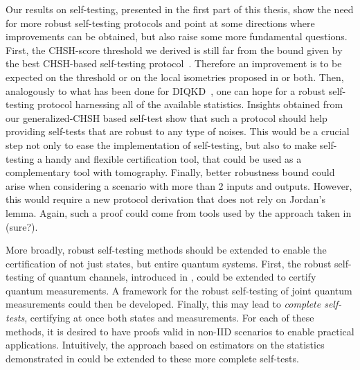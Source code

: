 \medbreak

Our results on self-testing, presented in the first part of this thesis, show the need for more robust self-testing protocols and point at some directions where improvements can be obtained, but also raise some more fundamental questions.
First, the CHSH-score threshold we derived is still far from the bound given by the best CHSH-based self-testing protocol~\cite{Kaniewski2016}.
Therefore an improvement is to be expected on the threshold or on the local isometries proposed in \cite{Kaniewski2016} or both.
Then, analogously to what has been done for DIQKD~\cite{Brown2021}, one can hope for a robust self-testing protocol harnessing all of the available statistics.
Insights obtained from our generalized-CHSH based self-test show that such a protocol should help providing self-tests that are robust to any type of noises.
This would be a crucial step not only to ease the implementation of self-testing, but also to make self-testing a handy and flexible certification tool, that could be used as a complementary tool with tomography.
Finally, better robustness bound could arise when considering a scenario with more than 2 inputs and outputs.
However, this would require a new protocol derivation that does not rely on Jordan's lemma.
Again, such a proof could come from tools used by the approach taken in \cite{Brown2021} (sure?).

\medbreak

More broadly, robust self-testing methods should be extended to enable the certification of not just states, but entire quantum systems.
First, the robust self-testing of quantum channels, introduced in \cite{Sekatski2018}, could be extended to certify quantum measurements.
A framework for the robust self-testing of joint quantum measurements could then be developed.
Finally, this may lead to \textit{complete self-tests}, certifying at once both states and measurements.
For each of these methods, it is desired to have proofs valid in non-IID scenarios to enable practical applications.
Intuitively, the approach based on estimators on the statistics demonstrated in \cite{Bancal2021} could be extended to these more complete self-tests. 



